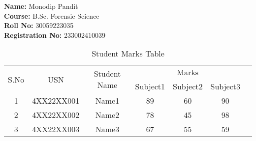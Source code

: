 \documentclass{article}
\begin{document}
\begin{center}
    \textbf{Name:} Monodip Pandit \\
    \textbf{Course:} B.Sc. Forensic Science \\
    \textbf{Roll No:} 30059223035 \\
    \textbf{Registration No:} 233002410039
\end{center}




\begin{table}[h!]
\centering
\caption{Student Marks Table}
\begin{tabular}{|c|c|c|c|c|c|c|}
\hline
\multirow{2}{*}{S.No} & \multirow{2}{*}{USN} & \multirow{2}{*}{Student Name} & \multicolumn{3}{c|}{Marks} \\ \cline{4-6}
                      &                      &                              & Subject1 & Subject2 & Subject3 \\ \hline
1                     & 4XX22XX001           & Name1                        & 89       & 60       & 90       \\ \hline
2                     & 4XX22XX002           & Name2                        & 78       & 45       & 98       \\ \hline
3                     & 4XX22XX003           & Name3                        & 67       & 55       & 59       \\ \hline
\end{tabular}
\end{table}
\end{document}
